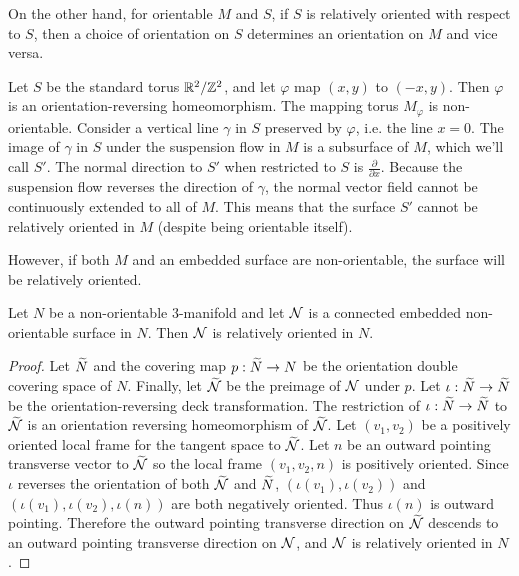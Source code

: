 On the other hand, for orientable $M$ and $S$, if $S$ is relatively oriented with respect to $S$, then a choice of orientation on $S$ determines an orientation on $M$ and vice versa.

  Let $S$ be the standard torus $\mathbb{R}^2/\mathbb{Z}^2$, and let $\varphi$ map $(x,y)$ to $(-x, y)$.
  Then $\varphi$ is an orientation-reversing homeomorphism.
  The mapping torus $M_\varphi$ is non-orientable.
  Consider a vertical line $\gamma$ in $S$ preserved by $\varphi$, i.e. the line
  $x = 0$.
  The image of $\gamma$ in $S$ under the suspension flow in $M$ is a subsurface of $M$, which we'll call $S'$.
  The normal direction to $S'$ when restricted to $S$ is $\frac{\partial}{\partial x}$.
  Because the suspension flow reverses the direction of $\gamma$, the normal vector field cannot be continuously extended to all of $M$.
  This means that the surface $S'$ cannot be relatively oriented in $M$ (despite being orientable itself).

\medskip
However, if both $M$ and an embedded surface are non-orientable, the surface will be relatively oriented.


\begin{prop}
  \label{prop:relative-orientability}
 Let $N$ be a non-orientable 3-manifold and let $\mathcal{N}$ is a connected embedded non-orientable surface in $N$.  Then $\mathcal{N}$ is relatively oriented in $N$.
\end{prop}
\begin{proof}
Let $\widetilde{N}$ and the covering map $p:\widetilde{N}\rightarrow N$ be the orientation double covering space of $N$.  Finally, let $\widetilde{\mathcal{N}}$ be the preimage of $\mathcal{N}$ under $p$.  Let $\iota:\widetilde{N}\rightarrow\widetilde{N}$ be the orientation-reversing deck transformation.
  The restriction of $\iota:\widetilde{N}\rightarrow\widetilde{N}$ to $\widetilde{\mathcal{N}}$ is an orientation reversing homeomorphism of $\widetilde{\mathcal{N}}$.
  Let $(v_1, v_2)$ be a positively oriented local frame for the tangent space to $\widetilde{\mathcal{N}}$.
  Let $n$ be an outward pointing transverse vector to $\widetilde{\mathcal{N}}$ so the local frame $(v_1, v_2, n)$ is positively oriented.
  Since $\iota$ reverses the orientation of both $\widetilde{\mathcal{N}}$ and $\widetilde{N}$, $(\iota(v_1), \iota(v_2))$ and $(\iota(v_1), \iota(v_2), \iota(n))$ are both negatively oriented.
  Thus $\iota(n)$ is outward pointing.
  Therefore the outward pointing transverse direction on $\widetilde{\mathcal{N}}$ descends to an outward pointing transverse direction on $\mathcal{N}$, and $\mathcal{N}$ is relatively oriented in $N$.
\end{proof}

